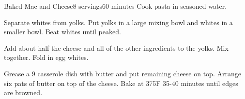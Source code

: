 \documentclass[../Cookbook.tex]{subfiles}
\begin{document}
\begin{recipe}[BakedMacAndCheese]{Baked Mac and Cheese}{8 servings}{60 minutes}
	Cook pasta in seasoned water.

	Separate whites from yolks. Put yolks in a large mixing bowl and whites in a smaller bowl.
	Beat whites until peaked.

	Add about half the cheese and all of the other ingredients to the yolks. Mix together.
	Fold in egg whites.

	Grease a 9 casserole dish with butter and put remaining cheese on top. Arrange six pats of butter on top of the cheese.
	Bake at 375\0F 35-40 minutes until edges are browned.
\end{recipe}
\end{document}

